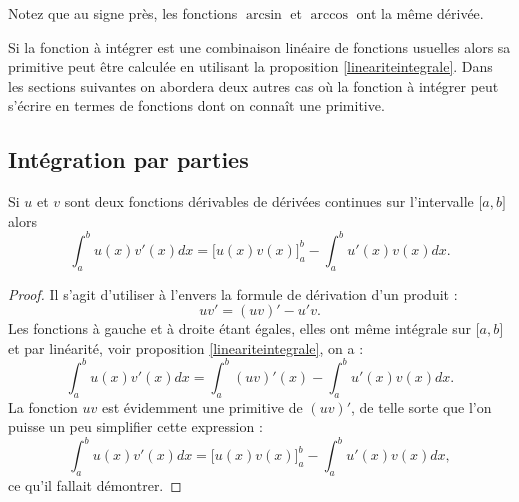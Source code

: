 Notez que au signe près, les fonctions \( \arcsin \) et \( \arccos\) ont la même dérivée.

Si la fonction à intégrer est une combinaison linéaire de fonctions usuelles alors sa primitive peut \^etre calculée en utilisant la proposition \ref{lineariteintegrale}. Dans les sections suivantes on abordera deux autres cas où la fonction à intégrer peut s'écrire en termes de fonctions dont on connaît une primitive.

\subsection{Intégration par parties}

\begin{proposition}
    Si \( u\) et \( v\) sont deux fonctions dérivables de dérivées continues sur l'intervalle \( \mathopen[ a , b \mathclose]\) alors
    \begin{equation}
        \int_a^b u(x)v'(x)dx=\big[ u(x)v(x) \big]_a^b-\int_a^bu'(x)v(x)dx.
    \end{equation}
\end{proposition}

\begin{proof}
    Il s'agit d'utiliser à l'envers la formule de dérivation d'un produit :
    \begin{equation}
        uv'=(uv)'-u'v.
    \end{equation}
    Les fonctions à gauche et à droite étant égales, elles ont même intégrale sur \( \mathopen[ a , b \mathclose]\) et par linéarité, voir  proposition \ref{lineariteintegrale}, on a :
    \begin{equation}
        \int_a^b u(x)v'(x)dx=\int_a^b (uv)'(x)-\int_a^b u'(x)v(x)dx.
    \end{equation}
    La fonction \( uv\) est évidemment une primitive de \( (uv)'\), de telle sorte que l'on puisse un peu simplifier cette expression :
    \begin{equation}
        \int_a^b u(x)v'(x)dx= \Big[ u(x)v(x) \Big]_a^b -\int_a^b u'(x)v(x)dx,
    \end{equation}
    ce qu'il fallait démontrer.
\end{proof}

